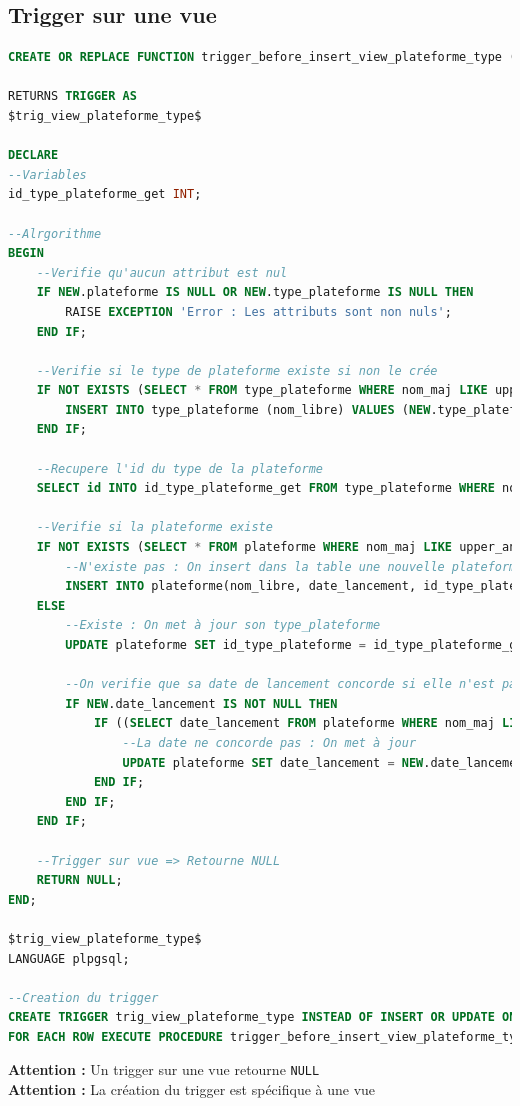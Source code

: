 \subsection{Trigger sur une vue}
\begin{lstlisting}[language=SQL]
CREATE OR REPLACE FUNCTION trigger_before_insert_view_plateforme_type ()

RETURNS TRIGGER AS
$trig_view_plateforme_type$

DECLARE
--Variables
id_type_plateforme_get INT;

--Alrgorithme
BEGIN
	--Verifie qu'aucun attribut est nul
	IF NEW.plateforme IS NULL OR NEW.type_plateforme IS NULL THEN
		RAISE EXCEPTION 'Error : Les attributs sont non nuls';
	END IF;
	
	--Verifie si le type de plateforme existe si non le crée
	IF NOT EXISTS (SELECT * FROM type_plateforme WHERE nom_maj LIKE upper_and_clean_text(NEW.type_plateforme, TRUE)) THEN
		INSERT INTO type_plateforme (nom_libre) VALUES (NEW.type_plateforme);
	END IF;
	
	--Recupere l'id du type de la plateforme
	SELECT id INTO id_type_plateforme_get FROM type_plateforme WHERE nom_maj LIKE upper_and_clean_text(NEW.type_plateforme, TRUE);
	
	--Verifie si la plateforme existe
	IF NOT EXISTS (SELECT * FROM plateforme WHERE nom_maj LIKE upper_and_clean_text(NEW.plateforme, TRUE)) THEN
		--N'existe pas : On insert dans la table une nouvelle plateforme
		INSERT INTO plateforme(nom_libre, date_lancement, id_type_plateforme) VALUES(NEW.plateforme, NEW.date_lancement, id_type_plateforme_get);
	ELSE
		--Existe : On met à jour son type_plateforme
		UPDATE plateforme SET id_type_plateforme = id_type_plateforme_get WHERE nom_maj LIKE upper_and_clean_text(NEW.plateforme, TRUE);
		
		--On verifie que sa date de lancement concorde si elle n'est pas nulle
		IF NEW.date_lancement IS NOT NULL THEN
			IF ((SELECT date_lancement FROM plateforme WHERE nom_maj LIKE upper_and_clean_text(NEW.plateforme, TRUE)) != NEW.date_lancement) OR ((SELECT date_lancement FROM plateforme WHERE nom_maj LIKE upper_and_clean_text(NEW.plateforme, TRUE)) IS NULL) THEN
				--La date ne concorde pas : On met à jour
				UPDATE plateforme SET date_lancement = NEW.date_lancement WHERE nom_libre LIKE NEW.plateforme;
			END IF;
		END IF;
	END IF;
		
	--Trigger sur vue => Retourne NULL
	RETURN NULL;
END;

$trig_view_plateforme_type$
LANGUAGE plpgsql;

--Creation du trigger
CREATE TRIGGER trig_view_plateforme_type INSTEAD OF INSERT OR UPDATE ON vue_plateforme_type
FOR EACH ROW EXECUTE PROCEDURE trigger_before_insert_view_plateforme_type ();
\end{lstlisting}
\textbf{Attention :} Un trigger sur une vue retourne \texttt{NULL}\\
\textbf{Attention :} La création du trigger est spécifique à une vue\\

